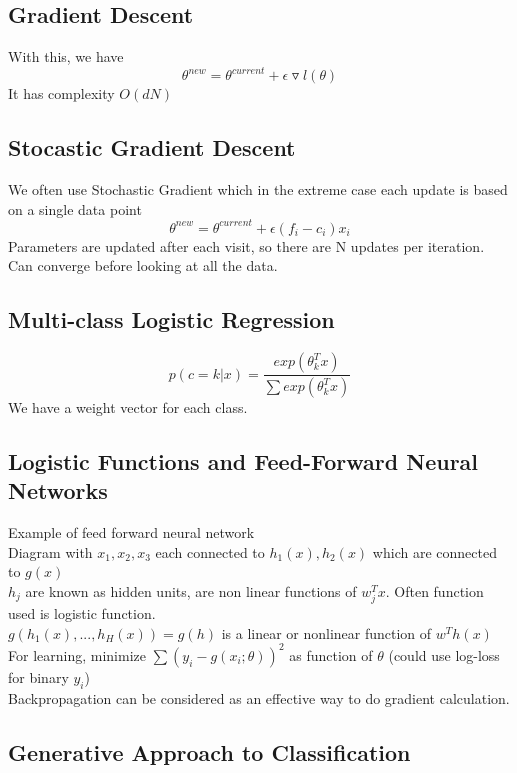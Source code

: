 \documentclass[11pt,psfig]{article}
\begin{document}
\subsection*{Gradient Descent}

With this, we have
\[
\theta^{new} = \theta^{current} + \epsilon \triangledown l(\theta)
\]
It has complexity $O(dN)$\\

\subsection*{Stocastic Gradient Descent}

We often use Stochastic Gradient which in the extreme case each update is based on a single data point
\[
\theta^{new} = \theta^{current} + \epsilon (f_i-c_i)x_i
\]
Parameters are updated after each visit, so there are N updates per iteration. Can converge before looking at all the data. 

\subsection*{Multi-class Logistic Regression}

\[
p(c=k|x) = \frac{exp(\theta_k^T x)}{\sum{exp(\theta_k^Tx)}}
\]
We have a weight vector for each class. 

\subsection*{Logistic Functions and Feed-Forward Neural Networks}

Example of feed forward neural network\\
Diagram with $x_1,x_2,x_3$ each connected to $h_1(x),h_2(x)$ which are connected to $g(x)$\\
$h_j$ are known as hidden units, are non linear functions of $w_j^Tx$. Often function used is logistic function. \\
$g( h_1(x),...,h_H(x)) = g(h)$ is a linear or nonlinear function of $w^Th(x)$\\
For learning, minimize $\sum{(y_i-g(x_i;\theta))^2}$ as function of $\theta$ (could use log-loss for binary $y_i$)\\
Backpropagation can be considered as an effective way to do gradient calculation.

\subsection*{Generative Approach to Classification}
\end{document}

